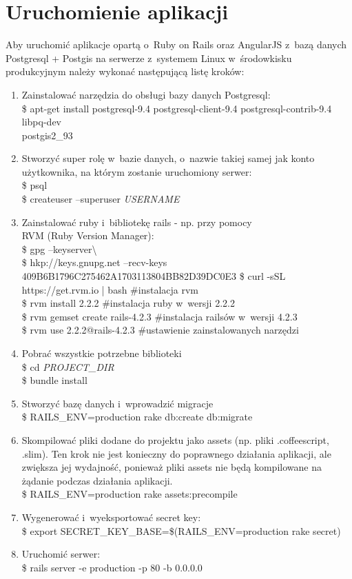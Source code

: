 \documentclass[eng,archivemode]{mgr}
\begin{document}
\section{Uruchomienie aplikacji}
Aby uruchomić aplikacje opartą o~Ruby on Rails oraz AngularJS z~bazą danych Postgresql + Postgis na serwerze z~systemem Linux w~środowkisku produkcyjnym należy wykonać następującą listę kroków:
\begin{enumerate}
	\item Zainstalować narzędzia do obsługi bazy danych Postgresql:\\
	\$ apt-get install postgresql-9.4 postgresql-client-9.4 postgresql-contrib-9.4 libpq-dev\\ postgis2\_93
	\item Stworzyć super rolę w~bazie danych, o~nazwie takiej samej jak konto użytkownika, na którym zostanie uruchomiony serwer: \\
	\$ psql \\
	\$ createuser --superuser \textit{USERNAME}
	\item  Zainstalować ruby i~bibliotekę rails - np. przy pomocy \\RVM (Ruby Version Manager):\\
	\$ gpg –keyserver\textbackslash\\
	\$ hkp://keys.gnupg.net –recv-keys 409B6B1796C275462A1703113804BB82D39DC0E3
	\$ curl -sSL https://get.rvm.io | bash \#instalacja rvm\\
	\$ rvm install 2.2.2 \#instalacja ruby w~wersji 2.2.2\\
	\$ rvm gemset create rails-4.2.3 \#instalacja railsów w~wersji 4.2.3\\
	\$ rvm use 2.2.2@rails-4.2.3 \#ustawienie zainstalowanych narzędzi \\
	\item Pobrać wszystkie potrzebne biblioteki\\
	\$ cd \textit{PROJECT\_DIR}\\
	\$ bundle install\\
	\item Stworzyć bazę danych i~wprowadzić migracje\\
	\$ RAILS\_ENV=production rake db:create db:migrate
	\item Skompilować pliki dodane do projektu jako assets (np. pliki .coffeescript, .slim). Ten krok nie jest konieczny do poprawnego działania aplikacji, ale zwiększa jej wydajność, ponieważ pliki assets nie będą kompilowane na żądanie podczas działania aplikacji.\\
	\$ RAILS\_ENV=production rake assets:precompile
	\item Wygenerować i~wyeksportować secret key:\\
	\$ export SECRET\_KEY\_BASE=\$(RAILS\_ENV=production rake secret)
	\item Uruchomić serwer:\\
	\$ rails server -e production -p 80 -b 0.0.0.0
	
	
\end{enumerate}
\end{document}
